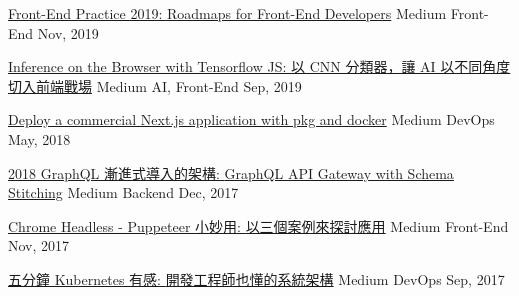 
\begin{cvhonors}

  \cvhonor
    {\href{https://medium.com/@evenchange4/front-end-practice-2019-251a5876a6c8}{Front-End Practice 2019: \textmd{Roadmaps for Front-End Developers}}} %
    {Medium} %
    {Front-End} %
    {Nov, 2019} %

  \cvhonor
    {\href{https://medium.com/@evenchange4/inference-on-the-browser-with-tensorflow-js-c7b4de863a2a}{Inference on the Browser with Tensorflow JS: \textmd{以 CNN 分類器，讓 AI 以不同角度切入前端戰場}}} %
    {Medium} %
    {AI, Front-End} %
    {Sep, 2019} %

  \cvhonor
    {\href{https://medium.com/@evenchange4/deploy-a-commercial-next-js-application-with-pkg-and-docker-5c73d4af2ee}{Deploy a commercial Next.js application with pkg and docker}} %
    {Medium} %
    {DevOps} %
    {May, 2018} %

  \cvhonor
    {\href{https://medium.com/@evenchange4/2018-graphql-\%E6\%BC\%B8\%E9\%80\%B2\%E5\%BC\%8F\%E5\%B0\%8E\%E5\%85\%A5\%E7\%9A\%84\%E6\%9E\%B6\%E6\%A7\%8B-aeb2603f2223}{2018 GraphQL 漸進式導入的架構: \textmd{GraphQL API Gateway with Schema Stitching}}} %
    {Medium} %
    {Backend} %
    {Dec, 2017} %

  \cvhonor
    {\href{https://medium.com/@evenchange4/chrome-headless-puppeteer-\%E5\%B0\%8F\%E5\%A6\%99\%E7\%94\%A8-9ac2c3b4e761}{Chrome Headless - Puppeteer 小妙用: \textmd{以三個案例來探討應用}}} %
    {Medium} %
    {Front-End} %
    {Nov, 2017} %

  \cvhonor
    {\href{https://medium.com/@evenchange4/\%E4\%BA\%94\%E5\%88\%86\%E9\%90\%98-kubernetes-\%E6\%9C\%89\%E6\%84\%9F-e51f093cb10b}{五分鐘 Kubernetes 有感: \textmd{開發工程師也懂的系統架構}}} %
    {Medium} %
    {DevOps} %
    {Sep, 2017} %


\end{cvhonors}
